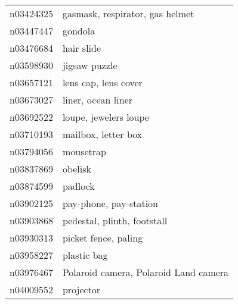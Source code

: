 \begin{appendices}
\begin{longtabu}{X|X[4]}
    		n03424325 &                                                                                            gasmask, respirator, gas helmet \tabularnewline
    		n03447447 &                                                                                                                    gondola \tabularnewline
    		n03476684 &                                                                                                                 hair slide \tabularnewline
    		n03598930 &                                                                                                              jigsaw puzzle \tabularnewline
    		n03657121 &                                                                                                       lens cap, lens cover \tabularnewline
    		n03673027 &                                                                                                         liner, ocean liner \tabularnewline
    		n03692522 &                                                                                                      loupe, jewelers loupe \tabularnewline
    		n03710193 &                                                                                                        mailbox, letter box \tabularnewline
    		n03794056 &                                                                                                                  mousetrap \tabularnewline
    		n03837869 &                                                                                                                    obelisk \tabularnewline
    		n03874599 &                                                                                                                    padlock \tabularnewline
    		n03902125 &                                                                                                     pay-phone, pay-station \tabularnewline
    		n03903868 &                                                                                                pedestal, plinth, footstall \tabularnewline
    		n03930313 &                                                                                                       picket fence, paling \tabularnewline
    		n03958227 &                                                                                                                plastic bag \tabularnewline
    		n03976467 &                                                                                      Polaroid camera, Polaroid Land camera \tabularnewline
    		n04009552 &                                                                                                                  projector \tabularnewline

\end{longtabu}
\end{appendices}
